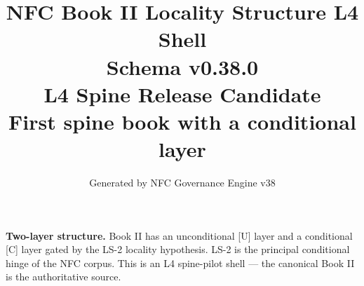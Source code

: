 \documentclass[11pt]{article}
\title{NFC Book II Locality Structure L4 Shell\\[1ex]\large Schema v0.38.0\\[0.5ex]
\normalsize L4 Spine Release Candidate\\[0.5ex]
\small First spine book with a conditional layer}
\author{Generated by NFC Governance Engine v38}
\date{}
\begin{document}
\maketitle
\tableofcontents
\bigskip
\noindent\textbf{Two-layer structure.} Book II has an unconditional [U] layer
and a conditional [C] layer gated by the LS-2 locality hypothesis.
LS-2 is the principal conditional hinge of the NFC corpus.
This is an L4 spine-pilot shell --- the canonical Book II is the authoritative source.
\vspace{1em}

\end{document}
